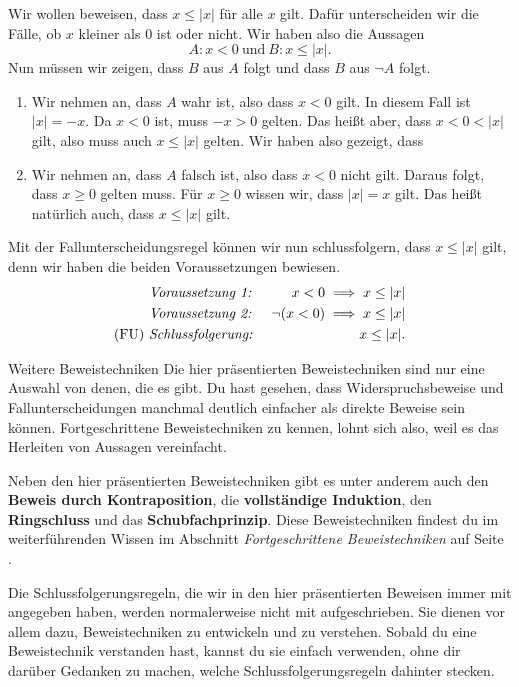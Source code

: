 \documentclass[../../main.tex]{subfiles}
\begin{document}
\begin{example}{}
    Wir wollen beweisen, dass $x\leq |x|$ für alle $x$ gilt. Dafür unterscheiden wir die Fälle, ob $x$ kleiner als $0$ ist oder nicht. Wir haben also die Aussagen
    \[A:x<0~\text{und}~B:x\leq |x|.\]
    Nun müssen wir zeigen, dass $B$ aus $A$ folgt und dass $B$ aus $\lnot A$ folgt.
    \begin{enumerate}
         \item
            Wir nehmen an, dass $A$ wahr ist, also dass $x<0$ gilt. In diesem Fall ist $|x|=-x$. Da $x<0$ ist, muss $-x>0$ gelten. Das heißt aber, dass $x<0<|x|$ gilt, also muss auch $x\leq |x|$ gelten. Wir haben also gezeigt, dass 
         \item
            Wir nehmen an, dass $A$ falsch ist, also dass $x<0$ nicht gilt. Daraus folgt, dass $x\geq 0$ gelten muss. Für $x\geq 0$ wissen wir, dass $|x|=x$ gilt. Das heißt natürlich auch, dass $x\leq |x|$ gilt.
    \end{enumerate}
    Mit der Fallunterscheidungsregel können wir nun schlussfolgern, dass $x\leq |x|$ gilt, denn wir haben die beiden Voraussetzungen bewiesen.
    \begin{align*}
        &\text{\emph{Voraussetzung~1:}}~&x<0 \implies x\leq |x|\\
        &\text{\emph{Voraussetzung~2:}}~&\lnot (x<0) \implies x\leq |x|\\
        \text{(FU)}~&\text{\emph{Schlussfolgerung:}}~&x\leq |x|.
    \end{align*}
\end{example}

\begin{advanced}{Weitere Beweistechniken}
    Die hier präsentierten Beweistechniken sind nur eine Auswahl von denen, die es gibt. Du hast gesehen, dass Widerspruchsbeweise und Fallunterscheidungen manchmal deutlich einfacher als direkte Beweise sein können. Fortgeschrittene Beweistechniken zu kennen, lohnt sich also, weil es das Herleiten von Aussagen vereinfacht.

    Neben den hier präsentierten Beweistechniken gibt es unter anderem auch den \textbf{Beweis durch Kontraposition}, die \textbf{vollständige Induktion}, den \textbf{Ringschluss} und das \textbf{Schubfachprinzip}. Diese Beweistechniken findest du im weiterführenden Wissen im Abschnitt \emph{Fortgeschrittene Beweistechniken} auf Seite \pageref{advanced-proofs}.
\end{advanced}

Die Schlussfolgerungsregeln, die wir in den hier präsentierten Beweisen immer mit angegeben haben, werden normalerweise nicht mit aufgeschrieben. Sie dienen vor allem dazu, Beweistechniken zu entwickeln und zu verstehen. Sobald du eine Beweistechnik verstanden hast, kannst du sie einfach verwenden, ohne dir darüber Gedanken zu machen, welche Schlussfolgerungsregeln dahinter stecken.
\end{document}
